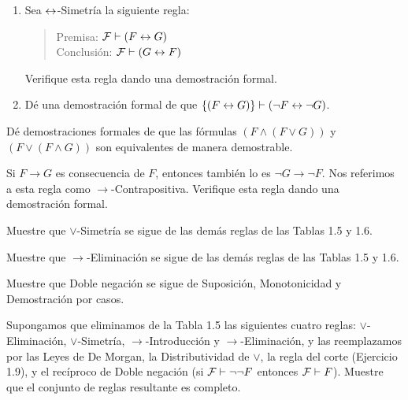 \documentclass[12pt,a4paper]{book}
\begin{document}
    \begin{ejercicio}
        \begin{enumerate}[label=(\alph*)]
            \item Sea $\leftrightarrow$-Simetría la siguiente regla:
            \begin{quote}
                Premisa: $\mathcal{F}\vdash(F\leftrightarrow G)$\\
                Conclusión: $\mathcal{F}\vdash(G\leftrightarrow F)$
            \end{quote}
            Verifique esta regla dando una demostración formal.
            \item Dé una demostración formal de que $\{(F\leftrightarrow G)\}\vdash(\neg F\leftrightarrow\neg G)$.
        \end{enumerate}
    \end{ejercicio}

    \begin{ejercicio}
        Dé demostraciones formales de que las fórmulas $(F\wedge(F\vee G))$ y $(F\vee(F\wedge G))$ son equivalentes de
        manera demostrable.
    \end{ejercicio}

    \begin{ejercicio}
        Si $F\rightarrow G$ es consecuencia de $F$, entonces también lo es $\neg G\rightarrow\neg F$. Nos referimos a esta
        regla como $\rightarrow$-Contrapositiva. Verifique esta regla dando una demostración formal.
    \end{ejercicio}

    \begin{ejercicio}
        Muestre que $\vee$-Simetría se sigue de las demás reglas de las Tablas 1.5 y 1.6.
    \end{ejercicio}

    \begin{ejercicio}
        Muestre que $\rightarrow$-Eliminación se sigue de las demás reglas de las Tablas 1.5 y 1.6.
    \end{ejercicio}

    \begin{ejercicio}
        Muestre que Doble negación se sigue de Suposición, Monotonicidad y Demostración por casos.
    \end{ejercicio}

    \begin{ejercicio}
        Supongamos que eliminamos de la Tabla 1.5 las siguientes cuatro reglas: $\vee$-Eliminación, $\vee$-Simetría,
        $\rightarrow$-Introducción y $\rightarrow$-Eliminación, y las reemplazamos por las Leyes de De Morgan, la
        Distributividad de $\vee$, la regla del corte (Ejercicio 1.9), y el recíproco de Doble negación (si
        $\mathcal{F}\vdash\neg\neg F$ entonces $\mathcal{F}\vdash F$). Muestre que el conjunto de reglas resultante es completo.
    \end{ejercicio}
\end{document}
